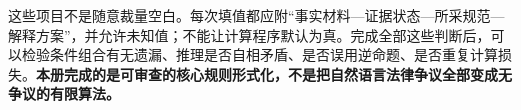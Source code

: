 这些项目不是随意裁量空白。每次填值都应附“事实材料—证据状态—所采规范—解释方案”，并允许未知值；不能让计算程序默认为真。完成全部这些判断后，可以检验条件组合有无遗漏、推理是否自相矛盾、是否误用逆命题、是否重复计算损失。\textbf{本册完成的是可审查的核心规则形式化，不是把自然语言法律争议全部变成无争议的有限算法。}


